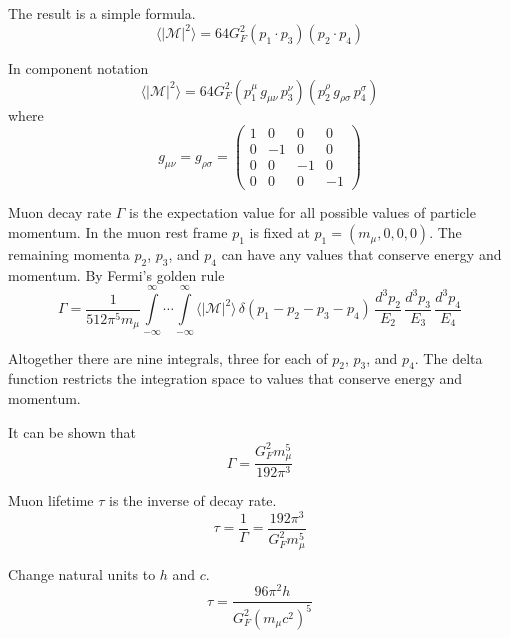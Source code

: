The result is a simple formula.
\begin{equation*}
\langle|\mathcal{M}|^2\rangle=64G_F^2(p_1\cdot p_3)(p_2\cdot p_4)
\tag{1}
\end{equation*}

In component notation
\begin{equation*}
\langle|\mathcal{M}|^2\rangle=64G_F^2
(p_1^\mu \, g_{\mu\nu} \, p_3^\nu)
(p_2^\rho \, g_{\rho\sigma} \, p_4^\sigma)
\end{equation*}
where
\begin{equation*}
g_{\mu\nu}=g_{\rho\sigma}=\begin{pmatrix}
1 & 0 & 0 & 0\\
0 & -1 & 0 & 0\\
0 & 0 & -1 & 0\\
0 & 0 & 0 & -1
\end{pmatrix}
\end{equation*}

Muon decay rate $\Gamma$ is the expectation value
for all possible values of particle momentum.
In the muon rest frame $p_1$ is fixed at $p_1=(m_\mu,0,0,0)$.
The remaining momenta $p_2$, $p_3$, and $p_4$ can have any values that conserve energy and momentum.
By Fermi's golden rule
\begin{equation*}
\Gamma=\frac{1}{512\pi^5m_\mu}
\int\limits_{-\infty}^\infty \cdots \int\limits_{-\infty}^\infty
\langle|\mathcal{M}|^2\rangle
\,\delta(p_1-p_2-p_3-p_4)
\,\frac{d^3p_2}{E_2}\,\frac{d^3p_3}{E_3}\,\frac{d^3p_4}{E_4}
\end{equation*}

Altogether there are nine integrals, three for each of $p_2$, $p_3$, and $p_4$.
The delta function restricts the integration space to values that conserve energy and momentum.

\bigskip
It can be shown that
\begin{equation*}
\Gamma=\frac{G_F^2 m_\mu^5}{192\pi^3}
\end{equation*}

Muon lifetime $\tau$ is the inverse of decay rate.
\begin{equation*}
\tau=\frac{1}{\Gamma}=\frac{192\pi^3}{G_F^2 m_\mu^5}
\end{equation*}

Change natural units to $h$ and $c$.
\begin{equation*}
\tau=\frac{96\pi^2h}{G_F^2\left(m_\mu c^2\right)^5}
\end{equation*}


